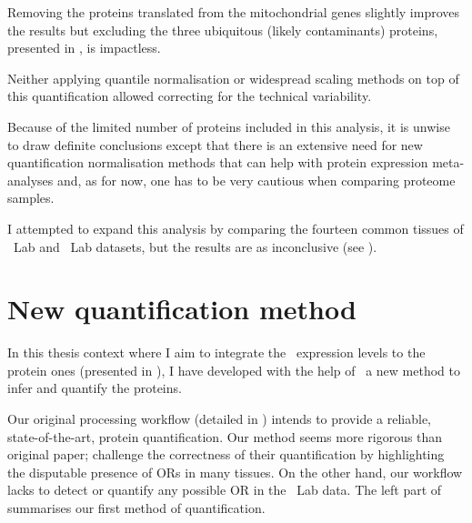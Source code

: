 Removing the proteins translated from the mitochondrial genes slightly
improves the results
but excluding the three ubiquitous (likely contaminants) proteins, presented
in ,
is impactless.\mybr\

Neither applying quantile normalisation or widespread scaling methods
on top of this quantification allowed correcting for the technical variability.

Because of the limited number of proteins included in this analysis,
it is unwise to draw definite conclusions
except that there is an extensive need for new quantification normalisation methods
that can help with protein expression meta-analyses
and, as for now, one has to be very cautious when comparing proteome samples.\mybr\

I attempted to expand this analysis by comparing the fourteen common tissues
of \pandey\ Lab and \kuster\ Lab datasets,
but the results are as inconclusive
(see ).\mybr\

\section{New quantification method}\label{sec:NewQuantProt}
\vspace{-3mm}
In this thesis context where I aim to integrate
the \mRNA\ expression levels to the protein ones
(presented in ),
I have developed with the help of \james\
a new method to infer and quantify the proteins.\mybr\

Our original processing workflow (detailed in )
intends to provide a reliable, state-of-the-art, protein quantification.
Our method seems more rigorous than \citet{PandeyData} original paper;
\citet{Ezkurdia2014-qx} challenge the correctness of their quantification
by highlighting the disputable presence of \glspl{OR} in many tissues.
On the other hand, our workflow lacks to detect or quantify any possible \gls{OR}
in the \pandey\ Lab data.
The left part of  summarises
our first method of quantification.\mybr\

